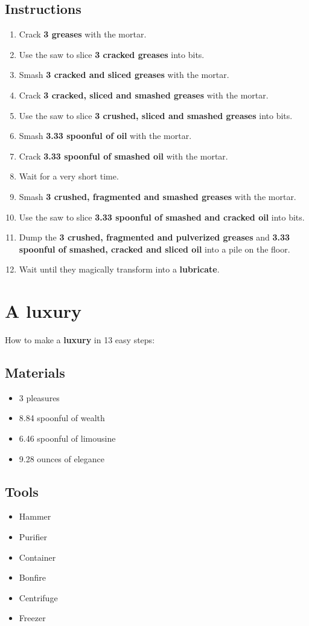 \documentclass{article}
\begin{document}
\subsection{Instructions}\begin{enumerate}
\item 
Crack \textbf{3 greases} with the mortar.
\item 
Use the saw to slice \textbf{3 cracked greases} into bits.
\item 
Smash \textbf{3 cracked and sliced greases} with the mortar.
\item 
Crack \textbf{3 cracked, sliced and smashed greases} with the mortar.
\item 
Use the saw to slice \textbf{3 crushed, sliced and smashed greases} into bits.
\item 
Smash \textbf{3.33 spoonful of oil} with the mortar.
\item 
Crack \textbf{3.33 spoonful of smashed oil} with the mortar.
\item 
Wait for a very short time.
\item 
Smash \textbf{3 crushed, fragmented and smashed greases} with the mortar.
\item 
Use the saw to slice \textbf{3.33 spoonful of smashed and cracked oil} into bits.
\item 
Dump the \textbf{3 crushed, fragmented and pulverized greases} and \textbf{3.33 spoonful of smashed, cracked and sliced oil} into a pile on the floor.
\item 
Wait until they magically transform into a \textbf{lubricate}.
\end{enumerate}
\newpage
\section{A luxury}How to make a \textbf{luxury} in 13 easy steps:

\subsection{Materials}\begin{itemize}
\item 
3 pleasures
\item 
8.84 spoonful of wealth
\item 
6.46 spoonful of limousine
\item 
9.28 ounces of elegance
\end{itemize}
\subsection{Tools}\begin{itemize}
\item 
Hammer
\item 
Purifier
\item 
Container
\item 
Bonfire
\item 
Centrifuge
\item 
Freezer
\end{itemize}
\end{document}
